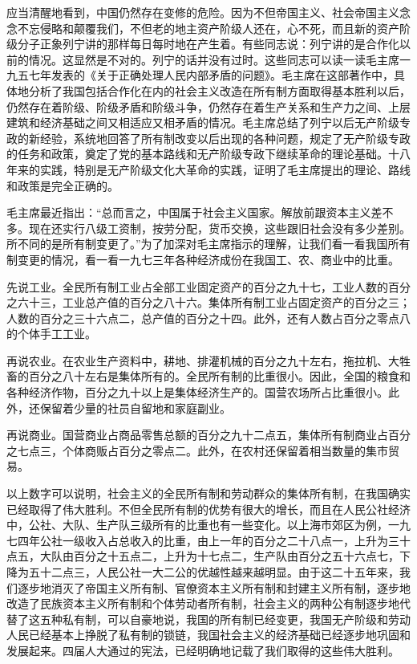 \begin{maonote}
应当清醒地看到，中国仍然存在变修的危险。因为不但帝国主义、社会帝国主义念念不忘侵略和颠覆我们，不但老的地主资产阶级人还在，心不死，而且新的资产阶级分子正象列宁讲的那样每日每时地在产生着。有些同志说：列宁讲的是合作化以前的情况。这显然是不对的。列宁的话并没有过时。这些同志可以读一读毛主席一九五七年发表的《关于正确处理人民内部矛盾的问题》。毛主席在这部著作中，具体地分析了我国包括合作化在内的社会主义改造在所有制方面取得基本胜利以后，仍然存在着阶级、阶级矛盾和阶级斗争，仍然存在着生产关系和生产力之间、上层建筑和经济基础之间又相适应又相矛盾的情况。毛主席总结了列宁以后无产阶级专政的新经验，系统地回答了所有制改变以后出现的各种问题，规定了无产阶级专政的任务和政策，奠定了党的基本路线和无产阶级专政下继续革命的理论基础。十八年来的实践，特别是无产阶级文化大革命的实践，证明了毛主席提出的理论、路线和政策是完全正确的。

毛主席最近指出：“总而言之，中国属于社会主义国家。解放前跟资本主义差不多。现在还实行八级工资制，按劳分配，货币交换，这些跟旧社会没有多少差别。所不同的是所有制变更了。”为了加深对毛主席指示的理解，让我们看一看我国所有制变更的情况，看一看一九七三年各种经济成份在我国工、农、商业中的比重。

先说工业。全民所有制工业占全部工业固定资产的百分之九十七，工业人数的百分之六十三，工业总产值的百分之八十六。集体所有制工业占固定资产的百分之三；人数的百分之三十六点二，总产值的百分之十四。此外，还有人数占百分之零点八的个体手工工业。

再说农业。在农业生产资料中，耕地、排灌机械的百分之九十左右，拖拉机、大牲畜的百分之八十左右是集体所有的。全民所有制的比重很小。因此，全国的粮食和各种经济作物，百分之九十以上是集体经济生产的。国营农场所占比重很小。此外，还保留着少量的社员自留地和家庭副业。

再说商业。国营商业占商品零售总额的百分之九十二点五，集体所有制商业占百分之七点三，个体商贩占百分之零点二。此外，在农村还保留着相当数量的集市贸易。

以上数字可以说明，社会主义的全民所有制和劳动群众的集体所有制，在我国确实已经取得了伟大胜利。不但全民所有制的优势有很大的增长，而且在人民公社经济中，公社、大队、生产队三级所有的比重也有一些变化。以上海市郊区为例，一九七四年公社一级收入占总收入的比重，由上一年的百分之二十八点一，上升为三十点五，大队由百分之十五点二，上升为十七点二，生产队由百分之五十六点七，下降为五十二点三，人民公社一大二公的优越性越来越明显。由于这二十五年来，我们逐步地消灭了帝国主义所有制、官僚资本主义所有制和封建主义所有制，逐步地改造了民族资本主义所有制和个体劳动者所有制，社会主义的两种公有制逐步地代替了这五种私有制，可以自豪地说，我国的所有制已经变更，我国无产阶级和劳动人民已经基本上挣脱了私有制的锁链，我国社会主义的经济基础已经逐步地巩固和发展起来。四届人大通过的宪法，已经明确地记载了我们取得的这些伟大胜利。


\end{maonote}

